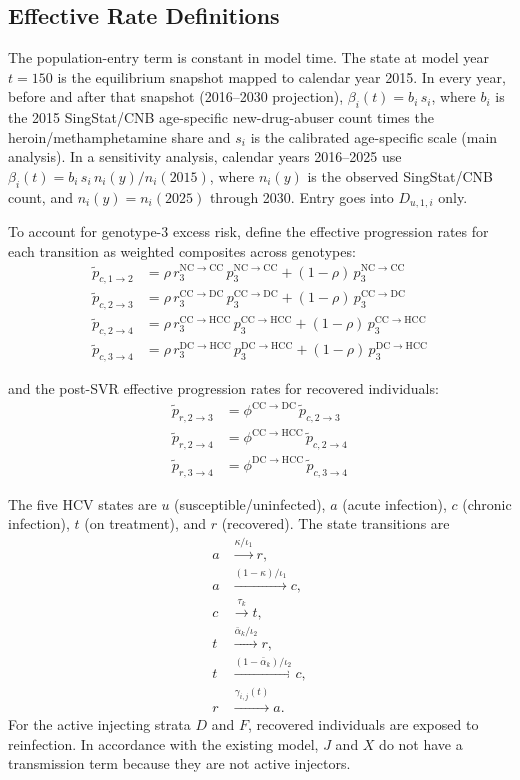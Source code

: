 \subsection{Effective Rate Definitions}

The population-entry term is constant in model time. The state at model year
$t=150$ is the equilibrium snapshot mapped to calendar year 2015. In every
year, before and after that snapshot (2016--2030 projection),
$\beta_i(t)=b_i\,s_i$, where $b_i$ is the 2015 SingStat/CNB age-specific
new-drug-abuser count times the heroin/methamphetamine share and $s_i$ is the
calibrated age-specific scale (main analysis). In a sensitivity analysis,
calendar years 2016--2025 use $\beta_i(t)=b_i\,s_i\,n_i(y)/n_i(2015)$, where
$n_i(y)$ is the observed SingStat/CNB count, and $n_i(y)=n_i(2025)$ through
2030. Entry goes into $D_{u,1,i}$ only.

To account for genotype-3 excess risk, define the effective progression 
rates for each transition as weighted composites across genotypes:
\begin{align*}
\tilde{p}_{c,1\to2} &= \rho\,r_3^{\mathrm{NC\to CC}}\,p_3^{\mathrm{NC\to CC}} 
                      + (1-\rho)\,p_3^{\mathrm{NC\to CC}} \\
\tilde{p}_{c,2\to3} &= \rho\,r_3^{\mathrm{CC\to DC}}\,p_3^{\mathrm{CC\to DC}} 
                      + (1-\rho)\,p_3^{\mathrm{CC\to DC}} \\
\tilde{p}_{c,2\to4} &= \rho\,r_3^{\mathrm{CC\to HCC}}\,p_3^{\mathrm{CC\to HCC}} 
                      + (1-\rho)\,p_3^{\mathrm{CC\to HCC}} \\
\tilde{p}_{c,3\to4} &= \rho\,r_3^{\mathrm{DC\to HCC}}\,p_3^{\mathrm{DC\to HCC}} 
                      + (1-\rho)\,p_3^{\mathrm{DC\to HCC}}
\end{align*}

\noindent and the post-SVR effective progression rates for recovered individuals:
\begin{align*}
\tilde{p}_{r,2\to3} &= \phi^{\mathrm{CC\to DC}}\,\tilde{p}_{c,2\to3} \\
\tilde{p}_{r,2\to4} &= \phi^{\mathrm{CC\to HCC}}\,\tilde{p}_{c,2\to4} \\
\tilde{p}_{r,3\to4} &= \phi^{\mathrm{DC\to HCC}}\,\tilde{p}_{c,3\to4}
\end{align*}

\noindent The five HCV states are $u$ (susceptible/uninfected), $a$ (acute
infection), $c$ (chronic infection), $t$ (on treatment), and $r$ (recovered).
The state transitions are
\begin{align*}
a &\xrightarrow{\kappa/\iota_1} r, \\
a &\xrightarrow{(1-\kappa)/\iota_1} c, \\
c &\xrightarrow{\tau_k} t, \\
t &\xrightarrow{\bar\alpha_k/\iota_2} r, \\
t &\xrightarrow{(1-\bar\alpha_k)/\iota_2} c, \\
r &\xrightarrow{\gamma_{i,j}(t)} a.
\end{align*}
For the active injecting strata $D$ and $F$, recovered individuals are exposed
to reinfection. In accordance with the existing model, $J$ and $X$ do not have
a transmission term because they are not active injectors.

